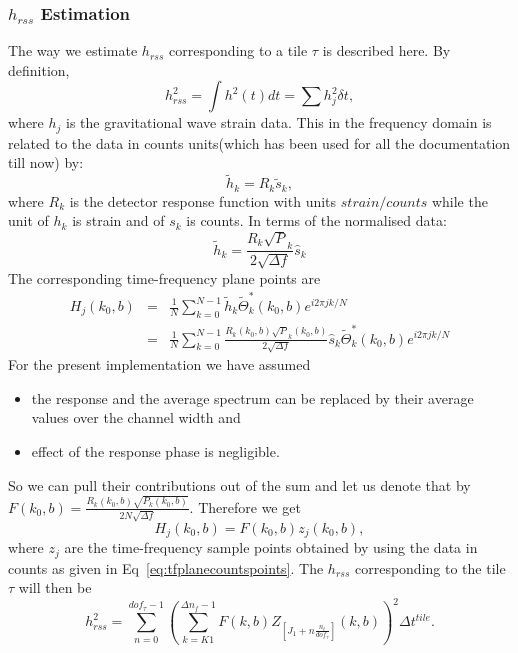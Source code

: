 \subsubsection{$h_{rss}$ Estimation}
The way we estimate $h_{rss}$ corresponding to a tile $\tau$ is described 
here.  By definition,
\begin{equation}
h_{rss}^2 =  \int h^2(t)dt = \sum h^2_j \delta t,
\end{equation}
where $h_j$ is the gravitational wave strain data. This in the frequency 
domain is related to the data in counts units(which has been used for all 
the documentation till now) by: 
\begin{equation}
\tilde h_k = R_k \tilde s_k,
\end{equation}  
where $R_k$ is the detector response function with units $strain / counts$ 
while the unit of $h_k$ is strain and of $s_k$ is counts.  In terms of the 
normalised data:
\begin{equation}
\tilde h_k = \frac{R_k \sqrt P_k}{2\sqrt {\Delta f }}\hat s_k
\end{equation}
The corresponding time-frequency plane points are 
\begin{eqnarray}
H_j(k_0, b) &=& \frac{1}{N}\sum_{k=0}^{N-1}\tilde h_k \tilde 
\Theta^\ast_k(k_0, b)e^{i 2 \pi jk/N} \\
&=& \frac{1}{N}\sum_{k=0}^{N-1} \frac{R_k(k_0, b)\sqrt P_k(k_0, b)}
{2\sqrt {\Delta f }}\hat s_k \tilde \Theta^\ast_k(k_0, b)e^{i 2 \pi jk/N}
\end{eqnarray}
For the present implementation we have assumed 
\begin{itemize}
\item the response and the average spectrum can be replaced by their average 
values over the channel width and 
\item effect of the response phase is negligible.  
\end{itemize}
So we can pull their contributions out of the sum and let us denote that by 
$F(k_0, b) = \frac{R_k(k_0, b)\sqrt {P_k(k_0, b)}}{2N\sqrt {\Delta f }}$.
Therefore we get 
\begin{equation}
H_j(k_0, b) = F(k_0, b) z_j(k_0, b) , 
\end{equation} 
where $z_j$ are the time-frequency sample points obtained by using the data 
in counts as given in Eq~\ref{eq:tfplanecountspoints}.  The $h_{rss}$ 
corresponding to the tile $\tau$ will then be 
\begin{equation}
h_{rss}^2 = \sum_{n=0}^{dof_{\tau}-1}(\sum_{k=K1}^{\Delta n_f - 1}
F(k,b)Z_{[J_1 + n\frac{n_t}{dof_{\tau}}]}(k,b))^2\Delta t^{tile}.
\end{equation}
